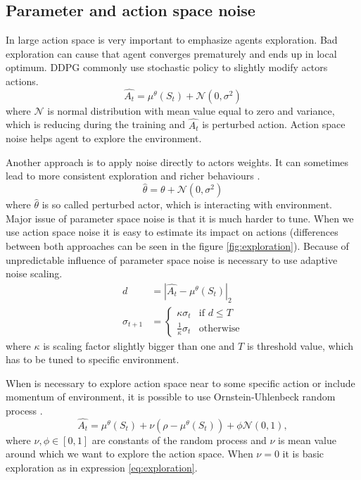 \subsection{Parameter and action space noise}
\label{sec:exploration}
In large action space is very important to emphasize agents exploration. Bad exploration can cause that agent converges prematurely and ends up in local optimum. DDPG commonly use stochastic policy to slightly modify actors actions.
\begin{equation} \label{eq:exploration}
\hat{A_t} = \mu^\theta(S_t) + \mathcal{N}(0, \sigma^2)
\end{equation}
where $\mathcal{N}$ is normal distribution with mean value equal to zero and variance, which is reducing during the training and $\hat{A_t}$ is perturbed action. Action space noise helps agent to explore the environment. \par Another approach is to apply noise directly to actors weights. It can sometimes lead to more consistent exploration and richer behaviours \cite{plappert2017}.
\begin{equation}
\hat{\theta} = \theta + \mathcal{N}(0, \sigma^2)
\end{equation}
where $\hat{\theta}$ is so called perturbed actor, which is interacting with environment. Major issue of parameter space noise is that it is much harder to tune. When we use action space noise it is easy to estimate its impact on actions (differences between both approaches can be seen in the figure \ref{fig:exploration}). Because of unpredictable influence of parameter space noise is necessary to use adaptive noise scaling.
\begin{align}
d &= |\hat{A_t} - \mu^\theta(S_t)|_2  \\
\sigma_{t+1} &= 
     \begin{cases}
       \kappa \sigma_t & \text{if } d \leq T \\
       \frac{1}{\kappa}\sigma_t & \text{otherwise}
     \end{cases}
\end{align}
where $\kappa$ is scaling factor slightly bigger than one and $T$ is threshold value, which has to be tuned to specific environment.
\par When is necessary to explore action space near to some specific action or include momentum of environment, it is possible to use Ornstein-Uhlenbeck random process \citep{lilicrap2015}. 
\begin{equation}
\hat{A_t} = \mu^\theta(S_t)  + \nu (\rho - \mu^\theta(S_t)) + \phi \mathcal{N}(0, 1),
\end{equation}
where $\nu, \phi \in [0, 1]$ are constants of the random process and $\nu$ is mean value around which we want to explore the action space. When $\nu = 0$ it is basic exploration as in expression \eqref{eq:exploration}.


